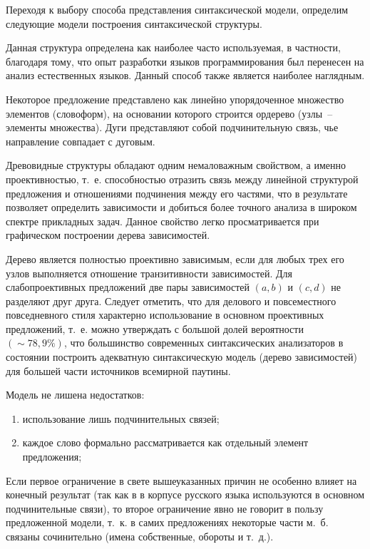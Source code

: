 \documentclass[a4paper,14pt,russian]{extreport}
\makeatletter
\renewcommand{\subsection}{\@startsection{subsection}{2}{\parindent}{3ex}{3ex}{\normalfont}}
\makeatother
\begin{document}
Переходя к выбору способа представления синтаксической модели, определим следующие модели построения синтаксической структуры.

\subsection{Дерево зависимостей}

Данная структура определена как наиболее часто используемая, в частности, благодаря тому, что опыт разработки языков программирования был перенесен на анализ естественных языков. Данный способ также является наиболее наглядным.

Некоторое предложение представлено как линейно упорядоченное множество элементов (словоформ), на основании которого строится ордерево (узлы~-- элементы множества). Дуги представляют собой подчинительную связь, чье направление совпадает с дуговым.

Древовидные структуры обладают одним немаловажным свойством, а именно проективностью, т.~е. способностью отразить связь между линейной структурой предложения и отношениями подчинения между его частями, что в результате позволяет определить зависимости и добиться более точного анализа в широком спектре прикладных задач. Данное свойство легко просматривается при графическом построении дерева зависимостей.

Дерево является полностью проективно зависимым, если для любых трех его узлов выполняется отношение транзитивности зависимостей. Для слабопроективных предложений две пары зависимостей $\left(a, b\right)$ и $\left(c, d\right)$ не разделяют друг друга. Следует отметить, что для делового и повсеместного повседневного стиля характерно использование в основном проективных предложений, т.~е. можно утверждать с большой долей вероятности $\left(\sim78,9\%\right)$, что большинство современных синтаксических анализаторов в состоянии построить адекватную синтаксическую модель (дерево зависимостей) для большей части источников всемирной паутины.

Модель не лишена недостатков:

\begin{enumerate}
\item использование лишь подчинительных связей;
\item каждое слово формально рассматривается как отдельный элемент предложения;
\end{enumerate}

Если первое ограничение в свете вышеуказанных причин не особенно влияет на конечный результат (так как в в корпусе русского языка используются в основном подчинительные связи), то второе ограничение явно не говорит в пользу предложенной модели, т.~к. в самих предложениях некоторые части м.~б. связаны сочинительно (имена собственные, обороты и т.~д.).
\end{document}
